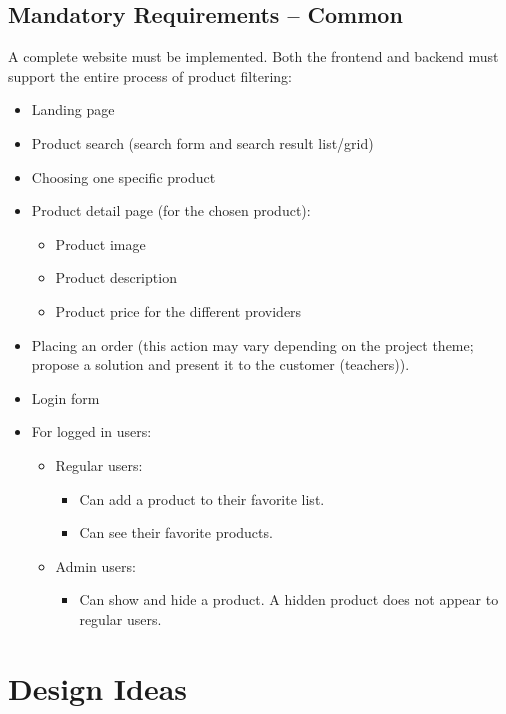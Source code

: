 \documentclass{article}
\begin{document}
\subsection{Mandatory Requirements – Common}
A complete website must be implemented. Both the frontend and backend must support the entire process of product filtering:
\begin{itemize}
    \item Landing page
    \item Product search (search form and search result list/grid)
    \item Choosing one specific product
    \item Product detail page (for the chosen product):
    \begin{itemize}
        \item Product image
        \item Product description
        \item Product price for the different providers
    \end{itemize}
    \item Placing an order (this action may vary depending on the project theme; propose a solution and present it to the customer (teachers)).
    \item Login form
    \item For logged in users:
    \begin{itemize}
        \item Regular users:
        \begin{itemize}
            \item Can add a product to their favorite list.
            \item Can see their favorite products.
        \end{itemize}
        \item Admin users:
        \begin{itemize}
            \item Can show and hide a product. A hidden product does not appear to regular users.
        \end{itemize}
    \end{itemize}
\end{itemize}

\section{Design Ideas}
\end{document}
